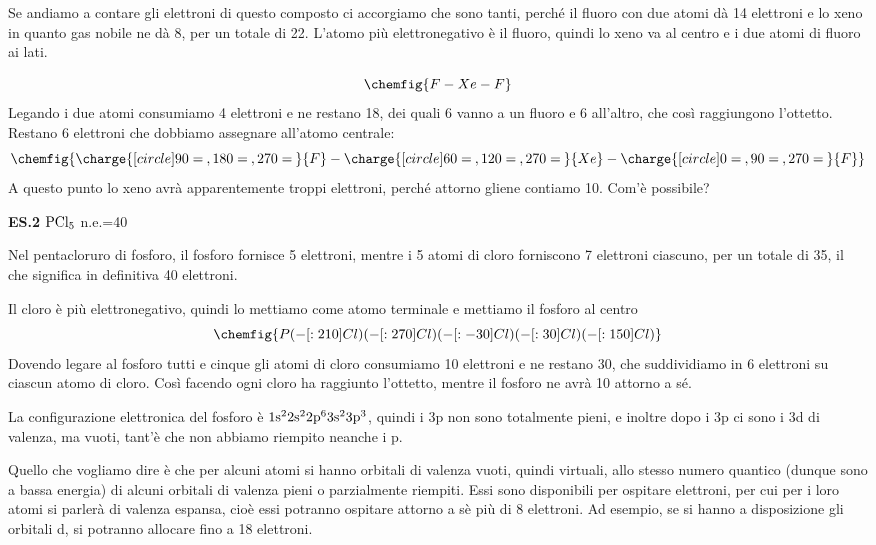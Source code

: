 Se andiamo a contare gli elettroni di questo composto ci accorgiamo che sono tanti, perché il fluoro con due atomi dà 14 elettroni e lo xeno in quanto gas nobile ne dà 8, per un totale di 22. L'atomo più elettronegativo è il fluoro, quindi lo xeno va al centro e i due atomi di fluoro ai lati. 
 
$$
\chemfig{F-Xe-F}
$$
Legando i due atomi consumiamo 4 elettroni e ne restano 18, dei quali 6 vanno a un fluoro e 6 all'altro, che così raggiungono l'ottetto. Restano 6 elettroni che dobbiamo assegnare all'atomo centrale:
$$
\chemfig{\charge{[circle]90=\:,180=\:,270=\:}{F}-\charge{[circle]60=\:,120=\:,270=\:}{Xe}-\charge{[circle]0=\:,90=\:,270=\:}{F}}
$$
A questo punto lo xeno avrà apparentemente troppi elettroni, perché attorno gliene contiamo 10. Com'è possibile?

\vspace{0.2cm}\textbf{ES.2} $\rm PCl_5$ n.e.=40
    
Nel pentacloruro di fosforo, il fosforo fornisce 5 elettroni, mentre i 5 atomi di cloro forniscono 7 elettroni ciascuno, per un totale di 35, il che significa in definitiva 40 elettroni.

Il cloro è più elettronegativo, quindi lo mettiamo come atomo terminale e mettiamo il fosforo al centro
$$
\chemfig{P(-[:210]Cl)(-[:270]Cl)(-[:-30]Cl)(-[:30]Cl)(-[:150]Cl)}
$$
Dovendo legare al fosforo tutti e cinque gli atomi di cloro consumiamo 10 elettroni e ne restano 30, che suddividiamo in 6 elettroni su ciascun atomo di cloro. Così facendo ogni cloro ha raggiunto l'ottetto, mentre il fosforo ne avrà 10 attorno a sé.
    
La configurazione elettronica del fosforo è $\rm 1s^22s^22p^63s^23p^3$, quindi i 3p non sono totalmente pieni, e inoltre dopo i 3p ci sono i 3d di valenza, ma vuoti, tant'è che non abbiamo riempito neanche i p.

Quello che vogliamo dire è che per alcuni atomi si hanno orbitali di valenza vuoti, quindi virtuali, allo stesso numero quantico (dunque sono a bassa energia) di alcuni orbitali di valenza pieni o parzialmente riempiti. Essi sono disponibili per ospitare elettroni, per cui per i loro atomi si parlerà di valenza espansa, cioè essi potranno ospitare attorno a sè più di 8 elettroni. Ad esempio, se si hanno a disposizione gli orbitali d, si potranno allocare fino a 18 elettroni.